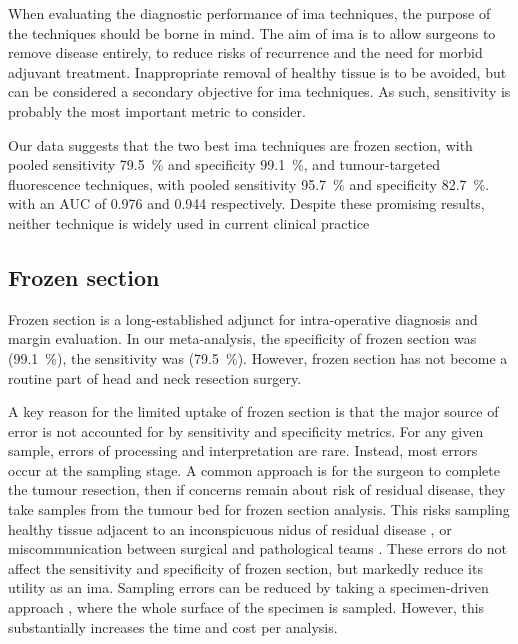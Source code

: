 When evaluating the diagnostic performance of \gls{ima} techniques, the purpose of the techniques should be borne in mind. 
The aim of \gls{ima} is to allow surgeons to remove disease entirely, to reduce risks of recurrence and the need for morbid adjuvant treatment.
Inappropriate removal of healthy tissue is to be avoided, but can be considered a secondary objective for \gls{ima} techniques.
As such, sensitivity is probably the most important metric to consider.

Our data suggests that the two best \gls{ima} techniques are frozen section, with pooled sensitivity \SI{79.5}{\percent} and specificity \SI{99.1}{\percent}, and tumour-targeted fluorescence techniques, with pooled sensitivity \SI{95.7}{\percent} and specificity \SI{82.7}{\percent}.
with an AUC of 0.976 and 0.944 respectively.
Despite these promising results, neither technique is widely used in current clinical practice

\subsection{Frozen section}

Frozen section is a long-established adjunct for intra-operative diagnosis and margin evaluation.
In our meta-analysis, the specificity of frozen section was (\SI{99.1}{\percent}), the sensitivity was (\SI{79.5}{\percent}).
However, frozen section has not become a routine part of head and neck resection surgery.

A key reason for the limited uptake of frozen section is that the major source of error is not accounted for by sensitivity and specificity metrics.
For any given sample, errors of processing and interpretation are rare.
Instead, most errors occur at the sampling stage.
A common approach is for the surgeon to complete the tumour resection, then if concerns remain about risk of residual disease, they take samples from the tumour bed for frozen section analysis\cite{layfieldFrozenSectionEvaluation2018}.
This risks sampling healthy tissue adjacent to an inconspicuous nidus of residual disease \cite{due.RefiningUtilityRole2016}, or miscommunication between surgical and pathological teams \cite{blackc.CriticalEvaluationFrozen2006}.
These errors do not affect the sensitivity and specificity of frozen section, but markedly reduce its utility as an \gls{ima}.
Sampling errors can be reduced by taking a specimen-driven approach \cite{maxwellEarlyOralTongue2015}, where the whole surface of the specimen is sampled.
However, this substantially increases the time and cost per analysis.

